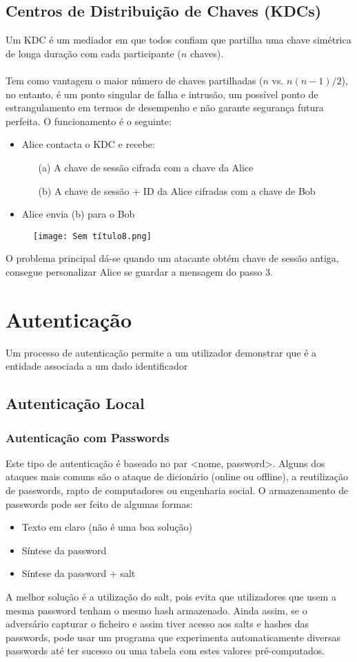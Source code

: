 \documentclass[10pt,a4paper]{report}
\begin{document}
\subsection{Centros de Distribuição de Chaves (KDCs)}
Um KDC é um mediador em que todos confiam que partilha uma chave simétrica de longa duração com cada participante ($n$ chaves).\\
\\
Tem como vantagem o maior número de chaves partilhadas ($n$ vs. $n(n-1)/2$), no entanto, é um ponto singular de falha e intrusão, um possível ponto de estrangulamento em termos de desempenho e não garante segurança futura perfeita. O funcionamento é o seguinte:
\begin{itemize}
\item Alice contacta o KDC e recebe:
\begin{itemize}
\item[(a)] A chave de sessão cifrada com a chave da Alice
\item[(b)] A chave de sessão + ID da Alice cifradas com a chave de Bob
\end{itemize}
\item Alice envia (b) para o Bob
\end{itemize}
\begin{figure}[H]
\centering
\texttt{[image: Sem título8.png]}
\end{figure}
O problema principal dá-se quando um atacante obtém chave de sessão antiga, consegue personalizar Alice se guardar a mensagem do passo 3.
\section{Autenticação}
Um processo de autenticação permite a um utilizador demonstrar que é a entidade associada a um dado identificador
\subsection{Autenticação Local}
\subsubsection{Autenticação com Passwords}
Este tipo de autenticação é baseado no par <nome, password>. Alguns dos ataques mais comuns são o ataque de dicionário (online ou offline), a reutilização de passwords, rapto de computadores ou engenharia social. O armazenamento de passwords pode ser feito de algumas formas:
\begin{itemize}
\item Texto em claro (não é uma boa solução)
\item Síntese da password
\item Síntese da password + salt
\end{itemize}
A melhor solução é a utilização do salt, pois evita que utilizadores que usem a mesma password tenham o mesmo hash armazenado. Ainda assim, se o adversário capturar o ficheiro e assim tiver acesso aos salts e hashes das passwords, pode usar um programa que experimenta automaticamente diversas passwords até ter sucesso ou uma tabela com estes valores pré-computados.
\end{document}
